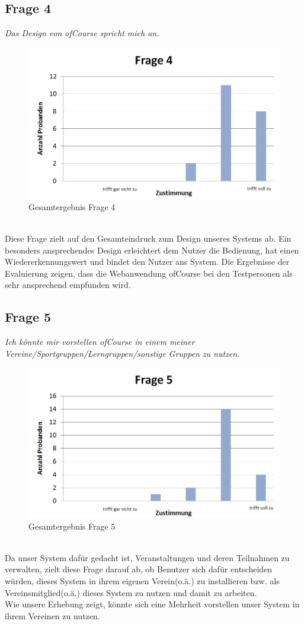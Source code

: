 \subsection{Frage 4}
\begin{center}
	{\it Das Design von ofCourse spricht mich an.}
\end{center}
\begin{figure}[h]
\centering
\includegraphics[width=0.7\linewidth]{img/Frage4}
\caption{Gesamtergebnis Frage 4}
\label{fig:Frage4}
\end{figure}\ \\

Diese Frage zielt auf den Gesamteindruck zum Design unseres Systems ab. Ein besonders ansprechendes Design erleichtert dem Nutzer die Bedienung, hat einen Wiedererkennungswert und bindet den Nutzer ans System. Die Ergebnisse der Evaluierung zeigen, dass die Webanwendung ofCourse bei den Testpersonen als sehr ansprechend empfunden wird.
\newpage
\subsection{Frage 5}
\begin{center}
	{\it Ich könnte mir vorstellen ofCourse in einem meiner Vereine/Sportgruppen/Lerngruppen/sonstige Gruppen zu nutzen.}
\end{center}
\begin{figure}[h]
\centering
\includegraphics[width=0.7\linewidth]{img/Frage5}
\caption{Gesamtergebnis Frage 5}
\label{fig:Frage5}
\end{figure}
\ \\
Da unser System dafür gedacht ist, Veranstaltungen und deren Teilnahmen zu verwalten, zielt diese Frage darauf ab, ob Benutzer sich dafür entscheiden würden, dieses System in ihrem eigenen Verein(o.ä.) zu installieren bzw. als Vereinsmitglied(o.ä.) dieses System zu nutzen und damit zu arbeiten.\\
Wie unsere Erhebung zeigt, könnte sich eine Mehrheit vorstellen unser System in ihrem Vereinen zu nutzen.
\ \\

